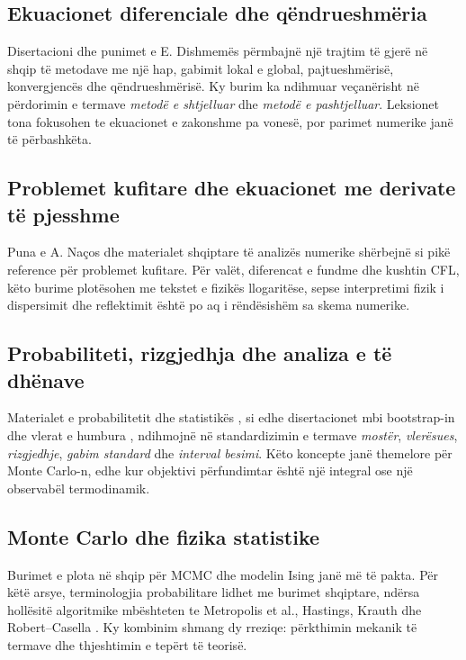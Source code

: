 \documentclass[11pt,oneside,openany]{book}
\begin{document}
\subsection{Ekuacionet diferenciale dhe qëndrueshmëria}
Disertacioni dhe punimet e E. Dishmemës \cite{dishmema,dishmemaArticle} përmbajnë një trajtim të gjerë në shqip të metodave me një hap, gabimit lokal e global, pajtueshmërisë, konvergjencës dhe qëndrueshmërisë. Ky burim ka ndihmuar veçanërisht në përdorimin e termave \emph{metodë e shtjelluar} dhe \emph{metodë e pashtjelluar}. Leksionet tona fokusohen te ekuacionet e zakonshme pa vonesë, por parimet numerike janë të përbashkëta.

\subsection{Problemet kufitare dhe ekuacionet me derivate të pjesshme}
Puna e A. Naços \cite{naco} dhe materialet shqiptare të analizës numerike shërbejnë si pikë reference për problemet kufitare. Për valët, diferencat e fundme dhe kushtin CFL, këto burime plotësohen me tekstet e fizikës llogaritëse, sepse interpretimi fizik i dispersimit dhe reflektimit është po aq i rëndësishëm sa skema numerike.

\subsection{Probabiliteti, rizgjedhja dhe analiza e të dhënave}
Materialet e probabilitetit dhe statistikës \cite{capollari}, si edhe disertacionet mbi bootstrap-in dhe vlerat e humbura \cite{butka,tasho}, ndihmojnë në standardizimin e termave \emph{mostër}, \emph{vlerësues}, \emph{rizgjedhje}, \emph{gabim standard} dhe \emph{interval besimi}. Këto koncepte janë themelore për Monte Carlo-n, edhe kur objektivi përfundimtar është një integral ose një observabël termodinamik.

\subsection{Monte Carlo dhe fizika statistike}
Burimet e plota në shqip për MCMC dhe modelin Ising janë më të pakta. Për këtë arsye, terminologjia probabilitare lidhet me burimet shqiptare, ndërsa hollësitë algoritmike mbështeten te Metropolis et al., Hastings, Krauth dhe Robert--Casella \cite{metropolis,hastings,krauth,robert}. Ky kombinim shmang dy rreziqe: përkthimin mekanik të termave dhe thjeshtimin e tepërt të teorisë.
\end{document}
